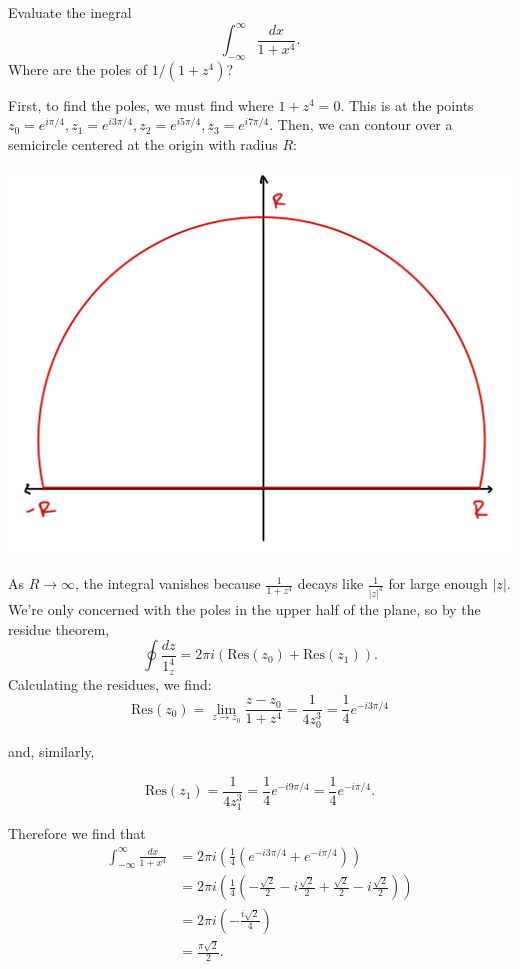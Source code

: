 \documentclass[12pt]{article}
\begin{document}
\begin{statement}[2]
  Evaluate the inegral 
  $$ \int^{\infty}_{-\infty} \frac{dx}{1+x^4}. $$
  Where are the poles of $1/(1+z^4)$?
\end{statement}
\begin{newproof}
  First, to find the poles, we must find where $1+z^4=0$. This is at the points $z_0=e^{i \pi/4}, 
  z_1=e^{i 3 \pi/4}, z_2=e^{i 5 \pi/4}, z_3=e^{i 7 \pi/4}$. Then, we can contour over a semicircle 
  centered at the origin with radius $R$:
  \par \begin{center} \includegraphics[scale=.2]{1.2-1.png} \end{center} 
  \par As $R \to \infty$, the integral vanishes because $\frac{1}{1+z^4}$ decays like $\frac{1}{\vert z \vert^4}$
  for large enough $\vert z \vert$. We're only concerned with the poles in the upper half of the plane, 
  so by the residue theorem, 
  $$ \oint \frac{dz}{1_z^4} = 2 \pi i (\text{Res}(z_0) + \text{Res}(z_1)). $$
  Calculating the residues, we find:
  $$ \text{Res}(z_0)= \lim_{z \to z_0} \frac{z-z_0}{1+z^4} = \frac{1}{4z_0^3} = \frac{1}{4} e^{-i 3 \pi /4} $$
  \begin{center} and, similarly, \end{center}
  $$ \text{Res}(z_1) = \frac{1}{4z_1^3}=\frac{1}{4}e^{-i9 \pi /4} = \frac{1}{4}e^{-i \pi /4}. $$
  \par Therefore we find that
  \begin{align*}
    \int^{\infty}_{-\infty} \frac{dx}{1+x^4} &= 2\pi i \left(\frac{1}{4}\left(e^{-i 3 \pi /4} + e^{-i \pi / 4}\right)\right) \\
                                             &= 2 \pi i \left( \frac{1}{4}\left(-\frac{\sqrt{2}}{2}-
                                             i\frac{\sqrt{2}}{2}+\frac{\sqrt{2}}{2}-i\frac{\sqrt{2}}{2}\right)\right) \\
                                             &= 2\pi i \left(-\frac{i\sqrt{2}}{4}\right) \\
                                             &= \frac{\pi \sqrt{2}}{2}.
  \end{align*}
\end{newproof}
\end{document}
